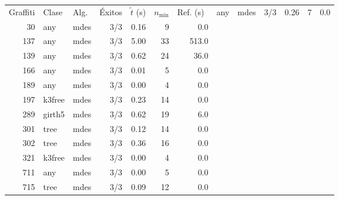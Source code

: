 \begin{tabular}{rl l rrr r}
\hline
Graffiti & Clase & Alg. & Éxitos & $\tilde t$ (s) & $n_{\min}$ & Ref. (s)\
 & any & mdes & 3/3 & 0.26 & 7 & 0.0\\
30 & any & mdes & 3/3 & 0.16 & 9 & 0.0\\
137 & any & mdes & 3/3 & 5.00 & 33 & 513.0\\
139 & any & mdes & 3/3 & 0.62 & 24 & 36.0\\
166 & any & mdes & 3/3 & 0.01 & 5 & 0.0\\
189 & any & mdes & 3/3 & 0.00 & 4 & 0.0\\
197 & k3free & mdes & 3/3 & 0.23 & 14 & 0.0\\
289 & girth5 & mdes & 3/3 & 0.62 & 19 & 6.0\\
301 & tree & mdes & 3/3 & 0.12 & 14 & 0.0\\
302 & tree & mdes & 3/3 & 0.36 & 16 & 0.0\\
321 & k3free & mdes & 3/3 & 0.00 & 4 & 0.0\\
711 & any & mdes & 3/3 & 0.00 & 5 & 0.0\\
715 & tree & mdes & 3/3 & 0.09 & 12 & 0.0\\
\hline
\end{tabular}
